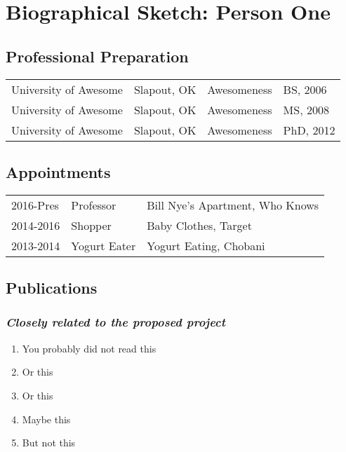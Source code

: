 
\setcounter{subsection}{0}
\renewcommand\thesubsection{(\alph{subsection})}
\renewcommand\thesubsubsection{\textit{(\roman{subsubsection})}}

\section*{Biographical Sketch: Person One}

\subsection{Professional Preparation}
\begin{tabular}[c]{llll}
University of Awesome & Slapout, OK & Awesomeness & BS, 2006\\
University of Awesome & Slapout, OK & Awesomeness & MS, 2008\\
University of Awesome & Slapout, OK & Awesomeness & PhD, 2012\\
\end{tabular}

\subsection{Appointments}
\begin{tabularx}{\textwidth}{ l l Y }
2016-Pres & Professor & Bill Nye's Apartment, Who Knows \\
2014-2016 & Shopper & Baby Clothes, Target \\
2013-2014 & Yogurt Eater & Yogurt Eating, Chobani \\
\end{tabularx}

\subsection{Publications}
\subsubsection{\textit{Closely related to the proposed project}}
\begin{enumerate}
\item You probably did not read this
\item Or this
\item Or this
\item Maybe this
\item But not this
\end{enumerate}
